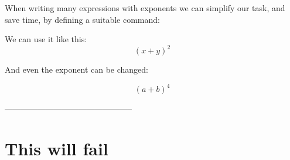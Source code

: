 \documentclass{article}
\begin{document}
	
	When writing many expressions with exponents we can simplify our task, and save time, by defining a suitable command:
	
	\newcommand{\plusbinomial}[3][2]{(#2 + #3)^#1}
	
	We can use it like this: \[ \plusbinomial{x}{y} \]
	
	And even the exponent can be changed:
	
	\[ \plusbinomial[4]{a}{b} \]
	
 				-----------------------------------------------
	
	\section{This will fail}
	
\end{document}
